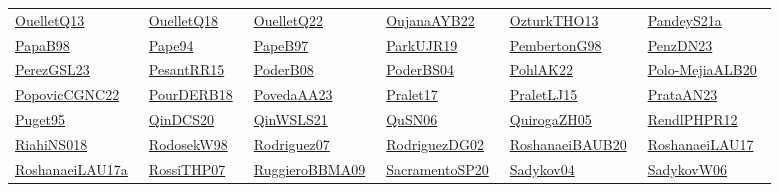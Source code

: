 \begin{longtable}{*{6}{l}}
\href{works/OuelletQ13.pdf}{OuelletQ13}~\cite{OuelletQ13} & \href{works/OuelletQ18.pdf}{OuelletQ18}~\cite{OuelletQ18} & \href{works/OuelletQ22.pdf}{OuelletQ22}~\cite{OuelletQ22} & \href{works/OujanaAYB22.pdf}{OujanaAYB22}~\cite{OujanaAYB22} & \href{works/OzturkTHO13.pdf}{OzturkTHO13}~\cite{OzturkTHO13} & \href{works/PandeyS21a.pdf}{PandeyS21a}~\cite{PandeyS21a}\\ 
\href{works/PapaB98.pdf}{PapaB98}~\cite{PapaB98} & \href{}{Pape94}~\cite{Pape94} & \href{}{PapeB97}~\cite{PapeB97} & \href{works/ParkUJR19.pdf}{ParkUJR19}~\cite{ParkUJR19} & \href{works/PembertonG98.pdf}{PembertonG98}~\cite{PembertonG98} & \href{}{PenzDN23}~\cite{PenzDN23}\\ 
\href{works/PerezGSL23.pdf}{PerezGSL23}~\cite{PerezGSL23} & \href{works/PesantRR15.pdf}{PesantRR15}~\cite{PesantRR15} & \href{works/PoderB08.pdf}{PoderB08}~\cite{PoderB08} & \href{works/PoderBS04.pdf}{PoderBS04}~\cite{PoderBS04} & \href{works/PohlAK22.pdf}{PohlAK22}~\cite{PohlAK22} & \href{works/Polo-MejiaALB20.pdf}{Polo-MejiaALB20}~\cite{Polo-MejiaALB20}\\ 
\href{works/PopovicCGNC22.pdf}{PopovicCGNC22}~\cite{PopovicCGNC22} & \href{works/PourDERB18.pdf}{PourDERB18}~\cite{PourDERB18} & \href{works/PovedaAA23.pdf}{PovedaAA23}~\cite{PovedaAA23} & \href{works/Pralet17.pdf}{Pralet17}~\cite{Pralet17} & \href{works/PraletLJ15.pdf}{PraletLJ15}~\cite{PraletLJ15} & \href{works/PrataAN23.pdf}{PrataAN23}~\cite{PrataAN23}\\ 
\href{works/Puget95.pdf}{Puget95}~\cite{Puget95} & \href{works/QinDCS20.pdf}{QinDCS20}~\cite{QinDCS20} & \href{works/QinWSLS21.pdf}{QinWSLS21}~\cite{QinWSLS21} & \href{works/QuSN06.pdf}{QuSN06}~\cite{QuSN06} & \href{works/QuirogaZH05.pdf}{QuirogaZH05}~\cite{QuirogaZH05} & \href{works/RendlPHPR12.pdf}{RendlPHPR12}~\cite{RendlPHPR12}\\ 
\href{works/RiahiNS018.pdf}{RiahiNS018}~\cite{RiahiNS018} & \href{works/RodosekW98.pdf}{RodosekW98}~\cite{RodosekW98} & \href{works/Rodriguez07.pdf}{Rodriguez07}~\cite{Rodriguez07} & \href{works/RodriguezDG02.pdf}{RodriguezDG02}~\cite{RodriguezDG02} & \href{}{RoshanaeiBAUB20}~\cite{RoshanaeiBAUB20} & \href{}{RoshanaeiLAU17}~\cite{RoshanaeiLAU17}\\ 
\href{}{RoshanaeiLAU17a}~\cite{RoshanaeiLAU17a} & \href{works/RossiTHP07.pdf}{RossiTHP07}~\cite{RossiTHP07} & \href{works/RuggieroBBMA09.pdf}{RuggieroBBMA09}~\cite{RuggieroBBMA09} & \href{works/SacramentoSP20.pdf}{SacramentoSP20}~\cite{SacramentoSP20} & \href{works/Sadykov04.pdf}{Sadykov04}~\cite{Sadykov04} & \href{works/SadykovW06.pdf}{SadykovW06}~\cite{SadykovW06}\\ 

\end{longtable}
